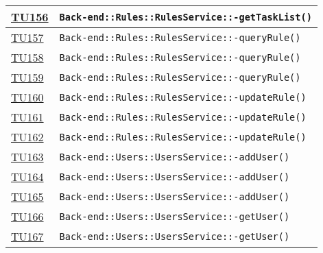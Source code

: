 \begin{longtable}{|>{\centering}m{1cm}|m{12cm}<{\centering}|}
\hyperlink{TU156}{TU156} & \texttt{Back-end::Rules::RulesService::-\linebreak getTaskList()}\\ \hline

\hyperlink{TU157}{TU157} & \texttt{Back-end::Rules::RulesService::-\linebreak queryRule()}\\ \hline

\hyperlink{TU158}{TU158} & \texttt{Back-end::Rules::RulesService::-\linebreak queryRule()}\\ \hline

\hyperlink{TU159}{TU159} & \texttt{Back-end::Rules::RulesService::-\linebreak queryRule()}\\ \hline

\hyperlink{TU160}{TU160} & \texttt{Back-end::Rules::RulesService::-\linebreak updateRule()}\\ \hline

\hyperlink{TU161}{TU161} & \texttt{Back-end::Rules::RulesService::-\linebreak updateRule()}\\ \hline

\hyperlink{TU162}{TU162} & \texttt{Back-end::Rules::RulesService::-\linebreak updateRule()}\\ \hline

\hyperlink{TU163}{TU163} & \texttt{Back-end::Users::UsersService::-\linebreak addUser()}\\ \hline

\hyperlink{TU164}{TU164} & \texttt{Back-end::Users::UsersService::-\linebreak addUser()}\\ \hline

\hyperlink{TU165}{TU165} & \texttt{Back-end::Users::UsersService::-\linebreak addUser()}\\ \hline

\hyperlink{TU166}{TU166} & \texttt{Back-end::Users::UsersService::-\linebreak getUser()}\\ \hline

\hyperlink{TU167}{TU167} & \texttt{Back-end::Users::UsersService::-\linebreak getUser()}\\ \hline


\end{longtable}
